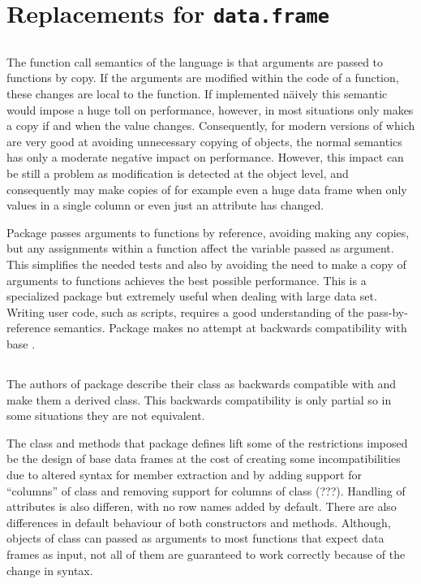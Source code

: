 \documentclass[krantz2]{krantz}\usepackage{knitr}%
\begin{document}
\section{Replacements for \texttt{data.frame}}

\subsection{}
The function call semantics of the \Rlang language is that arguments are passed to functions by copy. If the arguments are modified within the code of a function, these changes are local to the function. If implemented näively this semantic would impose a huge toll on performance, however, \Rlang in most situations only makes a copy if and when the value changes. Consequently, for modern versions of \Rlang which are very good at avoiding unnecessary copying of objects, the normal \Rlang semantics has only a moderate negative impact on performance. However, this impact can be still a problem as modification is detected at the object level, and consequently \Rlang may make copies of for example even a huge data frame when only values in a single column or even just an attribute has changed.

Package  passes arguments to functions by reference, avoiding making any copies, but any assignments within a function affect the variable passed as argument. This simplifies the needed tests and also by avoiding the need to make a copy of arguments to functions achieves the best possible performance. This is a specialized package but extremely useful when dealing with large data set. Writing user code, such as scripts, requires a good understanding of the pass-by-reference semantics. Package  makes no attempt at backwards compatibility with base \Rlang {}.

\subsection{}

The authors of package  describe their  class as backwards compatible with  and make them a derived class. This backwards compatibility is only partial so in some situations they are not equivalent.

The class and methods that package  defines lift some of the restrictions imposed be the design of base \Rlang data frames at the cost of creating some incompatibilities due to altered syntax for member extraction and by adding support for ``columns'' of class  and removing support for columns of class  (???). Handling of attributes is also differen, with no row names added by default. There are also differences in default behaviour of both constructors and methods. Although, objects of class  can passed as arguments to most functions that expect data frames as input, not all of them are guaranteed to work correctly because of the change in syntax.
\end{document}
